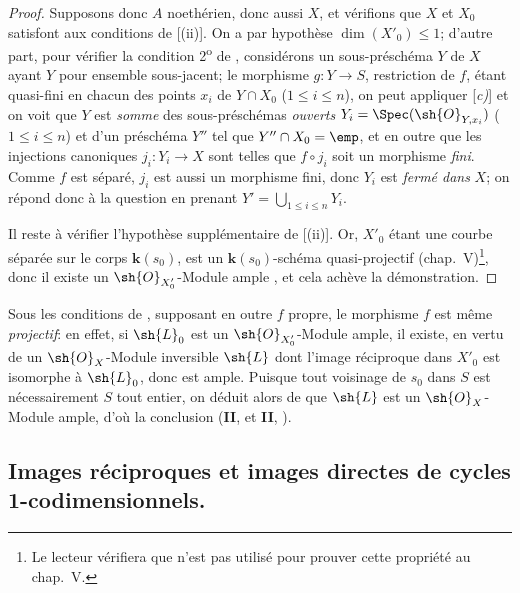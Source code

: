 \begin{proof}
Supposons donc $A$ noethérien, donc aussi $X$, et vérifions que $X$ et $X_0$ satisfont aux conditions de [(ii)].
On a par hypothèse $\dim(X'_0)\leq1$;
d'autre part, pour vérifier la condition 2\textsuperscript{o} de , considérons un sous-préschéma $Y$ de $X$ ayant $Y$ pour ensemble sous-jacent;
le morphisme $g:Y\to S$, restriction de $f$, étant quasi-fini en chacun des points $x_i$ de $Y\cap X_0$ ($1\leq i\leq n$), on peut appliquer [\emph{c)}] et on voit que $Y$ est \emph{somme} des sous-préschémas \emph{ouverts} $Y_i=\Spec(\sh{O}_{Y,x_i})$ ($1\leq i\leq n$) et d'un préschéma $Y''$ tel que $Y''\cap X_0=\emp$, et en outre que les injections canoniques $j_i:Y_i\to X$ sont telles que $f\circ j_i$ soit un morphisme \emph{fini}.
Comme $f$ est séparé, $j_i$ est aussi un morphisme fini, donc $Y_i$ est \emph{fermé dans} $X$;
on répond donc à la question en prenant $Y'=\bigcup_{1\leq i\leq n}Y_i$.

Il reste à vérifier l'hypothèse supplémentaire de [(ii)].
Or, $X'_0$ étant une courbe séparée sur le corps $\boldsymbol{k}(s_0)$, est un $\boldsymbol{k}(s_0)$-schéma quasi-projectif (chap.~V)\footnote{Le lecteur vérifiera que  n'est pas utilisé pour prouver cette propriété au chap.~V.}, donc il existe un $\sh{O}_{X'_0}$-Module ample , et cela achève la démonstration.
\end{proof}

\begin{remark}[21.9.13]
\label{IV.21.9.13}
Sous les conditions de , supposant en outre $f$ propre, le morphisme $f$ est même \emph{projectif}:
en effet, si $\sh{L}_0$ est un $\sh{O}_{X'_0}$-Module ample, il existe, en vertu de  un $\sh{O}_X$-Module inversible $\sh{L}$ dont l'image réciproque dans $X'_0$ est isomorphe à $\sh{L}_0$, donc est ample.
Puisque tout voisinage de $s_0$ dans $S$ est nécessairement $S$ tout entier, on déduit alors de  que $\sh{L}$ est un $\sh{O}_X$-Module ample, d'où la conclusion (\textbf{II},  et \textbf{II}, ).
\end{remark}

\subsection{Images réciproques et images directes de cycles 1-codimensionnels.}

